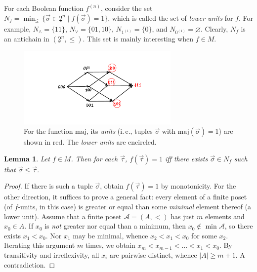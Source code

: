 \documentclass[12pt,notitlepage]{article}
\theoremstyle{plain}
\newtheorem{lemma}[thm]{Lemma}
\theoremstyle{definition}
\theoremstyle{plain}
\newcommand{\void}{\varnothing}
\newcommand{\ul}[1]{\underline{#1}}
\newcommand{\1}{\mathbf{1}}
\newcommand{\0}{\mathbf{0}}
\begin{document}
For each Boolean function $f^{(n)}$, consider the set $N_f = \min_{\leq}\, \{ \vec{\sigma} \in \ul{2}^n \mid f(\vec{\sigma}) = 1 \}$, which is called the set of \emph{lower units} for $f$. For example, $N_{\wedge} = \{11\}$, $N_{\vee} =\{01, 10\}$, $N_{1^{(1)}} = \{0\}$, and $N_{0^{(1)}} = \void$. Clearly, $N_f$ is an antichain in $(\ul{2}^n, {\leq})$. This set is mainly interesting when $f \in M$.

\begin{figure}[h]
\centering
\includegraphics*[width=0.7\textwidth]{lower_units.pdf}
\caption{For the function $\mathrm{maj}$, its \emph{units} (i.\,e., tuples $\vec{\sigma}$ with $\mathrm{maj}(\vec \sigma) = 1$) are shown in red. The \emph{lower units} are encircled.}
\end{figure}

\begin{lemma}\label{bool:mono_units}
Let $f \in M$. Then for each $\vec \tau$, $f(\vec \tau) = 1$ iff there exists $\vec{\sigma} \in N_f$ such that $\vec\sigma \leq \vec \tau$.
\end{lemma}
\begin{proof}
If there is such a tuple $\vec{\sigma}$, obtain $f(\vec \tau) = 1$ by monotonicity. For the other direction, it suffices to prove a general fact: every element of a finite poset (of $f$-units, in this case) is greater or equal than some \emph{minimal} element thereof (a lower unit). Assume that a finite poset $\mathcal A = (A, <)$ has just $m$ elements and $x_0 \in A$. If $x_0$ is \emph{not} greater nor equal than a minimum, then $x_0 \notin \min \mathcal A$, so there exists $x_1 < x_0$. Nor $x_1$ may be minimal, whence $x_2 < x_1 < x_0$ for some $x_2$. Iterating this argument $m$ times, we obtain $x_m < x_{m-1} < \ldots < x_1 < x_0$. By transitivity and irreflexivity, all $x_i$ are pairwise distinct, whence $|A| \geq m + 1$. A contradiction.
\end{proof}
\end{document}
